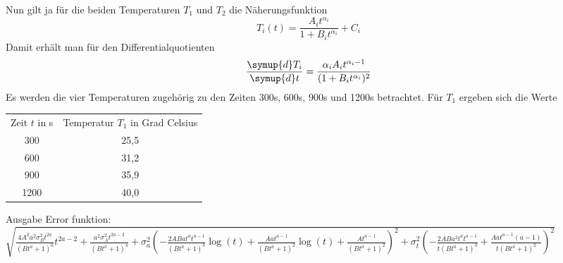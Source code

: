 Nun gilt ja für die beiden Temperaturen $T_1$ und $T_2$ die Näherungsfunktion
\begin{equation}
	T_i(t) = \frac{A_i t^{\alpha_i}}{1 + B_i t^{\alpha_i}} + C_i
\end{equation}
Damit erhält man für den Differentialquotienten
\begin{equation}
	\frac{\symup{d}T_i}{\symup{d}t} = \frac{\alpha_i A_i t^{\alpha_i - 1}}{(1 + B_i t^{\alpha_i})^2}
\end{equation}
Es werden die vier Temperaturen zugehörig zu den Zeiten 300s, 600s, 900s und 1200s betrachtet.
Für $T_1$ ergeben sich die Werte
\begin{table}
\begin{tabular}{cc}
Zeit $t$ in s & Temperatur $T_1$ in Grad Celsius \\
	300 & 25,5 \\
	600 & 31,2 \\
	900 & 35,9 \\
	1200 & 40,0 \\
\end{tabular}
\end{table}



Ausgabe Error funktion:
$\sqrt{\frac{4 A^{2} a^{2} \sigma_{B}^{2} t^{2 a}}{\left(B t^{a} + 1\right)^{6}} t^{2 a - 2} + \frac{a^{2} \sigma_{A}^{2} t^{2 a - 2}}{\left(B t^{a} + 1\right)^{4}} + \sigma_{a}^{2} \left(- \frac{2 A B a t^{a} t^{a - 1}}{\left(B t^{a} + 1\right)^{3}} \log{\left (t \right )} + \frac{A a t^{a - 1}}{\left(B t^{a} + 1\right)^{2}} \log{\left (t \right )} + \frac{A t^{a - 1}}{\left(B t^{a} + 1\right)^{2}}\right)^{2} + \sigma_{t}^{2} \left(- \frac{2 A B a^{2} t^{a} t^{a - 1}}{t \left(B t^{a} + 1\right)^{3}} + \frac{A a t^{a - 1} \left(a - 1\right)}{t \left(B t^{a} + 1\right)^{2}}\right)^{2}}$
